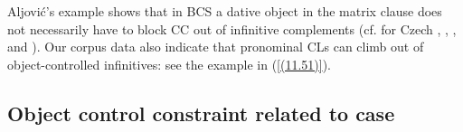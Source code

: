 \noindent Aljović’s example shows that in BCS a dative object in the matrix clause does not necessarily have to block CC out of infinitive complements (cf. for Czech \citealt{LelandToman76}, \citealt{Dotlacil04}, \citealt{Rezac05}, and \citealt{Hana07}). Our corpus data also indicate that pronominal CLs can climb out of object-controlled infinitives: see the example in (\ref{(11.51)}).



\subsection{Object control constraint related to case}
\label{Object control constraint related to case}

